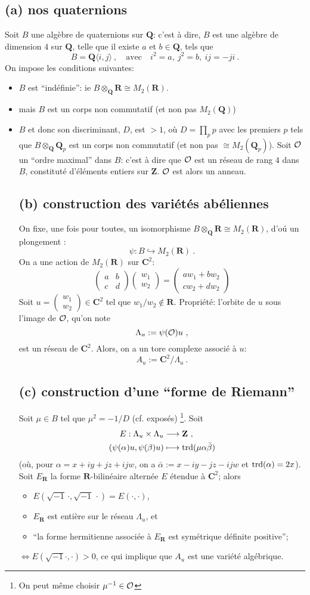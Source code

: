 \documentclass[a4paper, 12pt]{article}
\newcommand\C{\mathbf{C}} \newcommand\Q{\mathbf{Q}} \newcommand\R{\mathbf{R}} \newcommand\Z{\mathbf{Z}} \newcommand\lam{\Lambda}
\newcommand{\cvtwo}[2]{{\left(\begin{array}{c}{#1}\\ {#2}\end{array}\right)}}
\newcommand{\mtwo}[4]{{\left(\begin{array}{cc}{#1} & {#2} \\ {#3} & {#4}\end{array}\right)}}
\begin{document}
\subsection*{(a) nos quaternions}
Soit \(B\) une alg\`ebre de quaternions sur \(\Q\): c'est \`a dire,
\(B\) est une alg\`ebre de dimension \(4\) sur \(\Q\), telle que il existe
\(a\) et \(b\in\Q\), tels que
\[
B = \Q\langle i,j\rangle
\ ,
\quad \text{avec}\quad
i^2 = a,
\
j^2 = b,
\
ij = -ji
\ .
\]
On impose les conditions suivantes:
\begin{itemize}
\item \(B\) est ``ind\'efinie'': ie \(B\otimes_\Q\R \cong M_2(\R)\).
\item mais \(B\) est un corps non commutatif (et non pas $M_2(\Q)$)
\item \(B\) et donc son discriminant, $D$, est $>1$,
o\`u \(D = \prod_{p}p\) avec les premiers \(p\)
tels que \(B\otimes_\Q \Q_p\) est un corps non commutatif
(et non pas \(\cong M_2(\Q_p)\)).
\eit
Soit \(\mathcal{O}\) un ``ordre maximal''
dans \(B\): c'est \`a dire que \(\mathcal{O}\) est un r\'eseau de rang \(4\) dans \(B\),
constitut\'e d'\'el\'ements entiers sur \(\Z\). \(\mathcal{O}\)
est alors un anneau.

\subsection*{(b) construction des vari\'et\'es ab\'eliennes}
On fixe, une fois pour toutes, un isomorphisme $B\otimes_\Q\R \cong M_2(\R)$, d'o\'u un plongement :
\[
\psi: B \hookrightarrow M_2(\R)
\ .
\]
On a une action de \(M_2(\R)\) sur \(\C^2\):
\[
\mtwo{a}{b}{c}{d} \cvtwo{w_1}{w_2}
=
\cvtwo{aw_1 + bw_2}{cw_2 + dw_2}
\]
Soit \(u = \cvtwo{w_1}{w_2} \in \C^2\)
tel que \(w_1/w_2 \notin \R\).
Propri\'et\'e: l'orbite de \(u\) sous l'image de \(\mathcal{O}\), qu'on note
\[
\Lambda_u := \psi(\mathcal{O})u
\ ,
\]
est un r\'eseau de \(\C^2\).
Alors, on a un tore complexe associ\'e \`a \(u\):
\[
A_u := \C^2/\Lambda_u
\ .
\]
\subsection*{(c) construction d'une ``forme de Riemann''}
Soit \(\mu \in B\) tel que \(\mu^2 = -1/D\)
(cf. expos\'es)
\footnote{On peut m\^eme choisir \(\mu^{-1}\in \mathcal{O}\)}.
Soit
\begin{align*}
E : \Lambda_u\times\Lambda_u
&
\longrightarrow \Z
\ ,
\\
(\psi(\alpha)u, \psi(\beta)u)
&
\longmapsto \trd(\mu\alpha\bar\beta)
\end{align*}
(o\`u, pour \(\alpha = x + iy + jz + ijw\),
on a \(\bar\alpha := x - iy - jz - ijw\)
et \(\operatorname*{trd}(\alpha) = 2x\)).
Soit \(E_\R\) la forme \(\R\)-bilin\'eaire altern\'ee \(E\)
\'etendue \`a \(\C^2\); alors
\begin{itemize}
\item
\(E(\sqrt{-1}\,\cdot,\sqrt{-1}\,\cdot) = E(\cdot,\cdot)\),
\item
\(E_\R\) est enti\`ere sur le r\'eseau \(\Lambda_u\), et
\item
``la forme hermitienne associ\'ee \`a \(E_\R\)
est sym\'etrique d\'efinite positive'';
\end{itemize}
\(\iff E(\sqrt{-1}\cdot,\cdot) > 0\),
ce qui implique que \(A_u\) est une vari\'et\'e alg\'ebrique.

\end{itemize}
\end{document}
